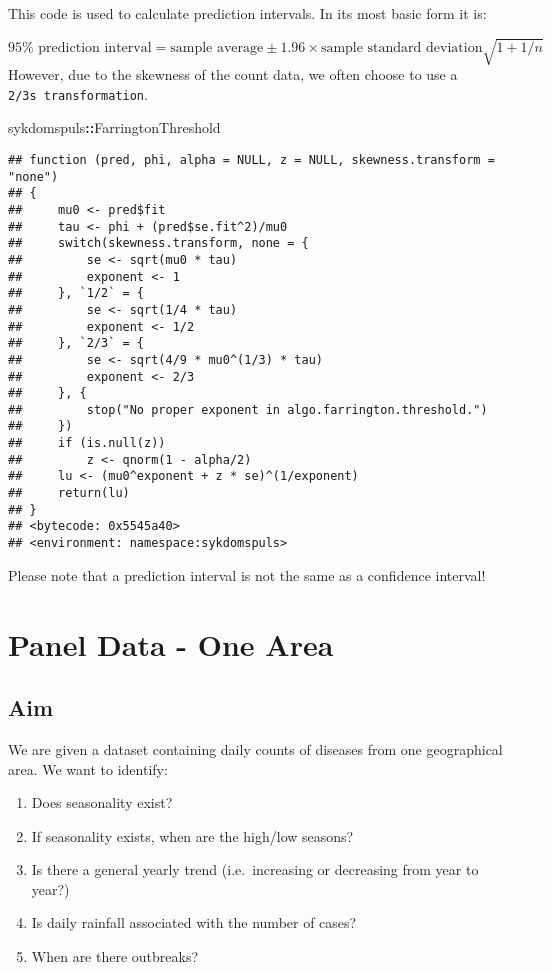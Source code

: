 \documentclass[]{book}
\newenvironment{Shaded}{\begin{snugshade}}{\end{snugshade}}
\newcommand{\OperatorTok}[1]{\textcolor[rgb]{0.81,0.36,0.00}{\textbf{#1}}}
\newcommand{\NormalTok}[1]{#1}
\providecommand{\tightlist}{%
  \setlength{\itemsep}{0pt}\setlength{\parskip}{0pt}}
\begin{document}
This code is used to calculate prediction intervals. In its most basic
form it is:

\[
95\% \text{ prediction interval} = \text{sample average} \pm 1.96 \times \text{sample standard deviation} \sqrt{ 1 + 1 / n}
\] However, due to the skewness of the count data, we often choose to
use a \texttt{2/3s\ transformation}.

\begin{Shaded}
\begin{Highlighting}[]
\NormalTok{sykdomspuls}\OperatorTok{::}\NormalTok{FarringtonThreshold}
\end{Highlighting}
\end{Shaded}

\begin{verbatim}
## function (pred, phi, alpha = NULL, z = NULL, skewness.transform = "none") 
## {
##     mu0 <- pred$fit
##     tau <- phi + (pred$se.fit^2)/mu0
##     switch(skewness.transform, none = {
##         se <- sqrt(mu0 * tau)
##         exponent <- 1
##     }, `1/2` = {
##         se <- sqrt(1/4 * tau)
##         exponent <- 1/2
##     }, `2/3` = {
##         se <- sqrt(4/9 * mu0^(1/3) * tau)
##         exponent <- 2/3
##     }, {
##         stop("No proper exponent in algo.farrington.threshold.")
##     })
##     if (is.null(z)) 
##         z <- qnorm(1 - alpha/2)
##     lu <- (mu0^exponent + z * se)^(1/exponent)
##     return(lu)
## }
## <bytecode: 0x5545a40>
## <environment: namespace:sykdomspuls>
\end{verbatim}

Please note that a prediction interval is not the same as a confidence
interval!

\chapter{Panel Data - One Area}\label{panel-data---one-area}

\section{Aim}\label{aim}

We are given a dataset containing daily counts of diseases from one
geographical area. We want to identify:

\begin{enumerate}
\def\labelenumi{\arabic{enumi}.}
\tightlist
\item
  Does seasonality exist?
\item
  If seasonality exists, when are the high/low seasons?
\item
  Is there a general yearly trend (i.e.~increasing or decreasing from
  year to year?)
\item
  Is daily rainfall associated with the number of cases?
\item
  When are there outbreaks?
\end{enumerate}
\end{document}
